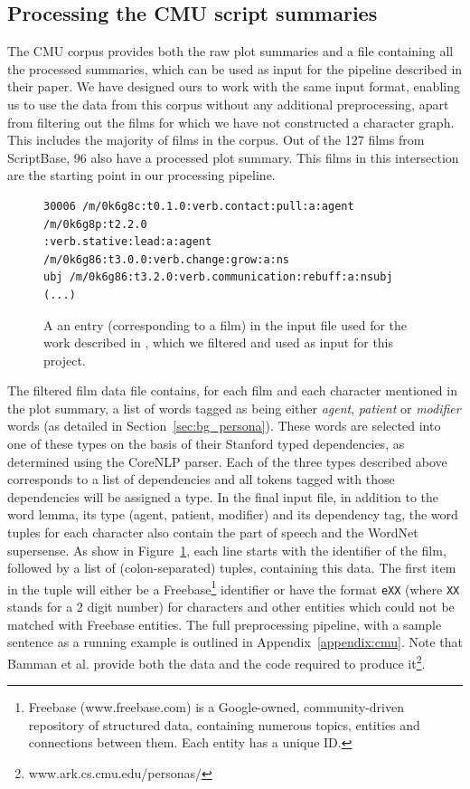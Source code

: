 \documentclass[bsc,frontabs,singlespacing,parskip, twoside]{infthesis}
\begin{document}
\subsection{Processing the CMU script summaries}
\label{sec:processing_cmu}
The CMU corpus provides both the raw plot summaries and a file containing all the processed summaries, which can be used as input for the pipeline described in their paper. We have designed ours to work with the same input format, enabling us to use the data from this corpus without any additional preprocessing, apart from filtering out the films for which we have not constructed a character graph. This includes the majority of films in the corpus. Out of the 127 films from ScriptBase, 96 also have a processed plot summary. This films in this intersection are the starting point in our processing pipeline.

\begin{figure}[h]
\centering
\begin{minipage}{14.5cm}
\begin{Verbatim}[frame=single]
30006 /m/0k6g8c:t0.1.0:verb.contact:pull:a:agent /m/0k6g8p:t2.2.0
:verb.stative:lead:a:agent /m/0k6g86:t3.0.0:verb.change:grow:a:ns
ubj /m/0k6g86:t3.2.0:verb.communication:rebuff:a:nsubj (...)
\end{Verbatim}
\end{minipage}
\caption{A an entry (corresponding to a film) in the input file used for the work described in \cite{Bamman2013}, which we filtered and used as input for this project.}
\label{fig:bamman_input}
\end{figure}


The filtered film data file contains, for each film and each character mentioned in the plot summary, a list of words tagged as being either \textit{agent}, \textit{patient} or \textit{modifier} words (as detailed in Section~\ref{sec:bg_persona}). These words are selected into one of these types on the basis of their Stanford typed dependencies, as determined using the CoreNLP parser. Each of the three types described above corresponds to a list of dependencies and all tokens tagged with those dependencies will be assigned a type. In the final input file, in addition to the word lemma, its type (agent, patient, modifier) and its dependency tag, the word tuples for each character also contain the part of speech and the WordNet supersense. As show in Figure~\ref{fig:bamman_input}, each line starts with the identifier of the film, followed by a list of (colon-separated) tuples, containing this data. The first item in the tuple will either be a Freebase\footnote{Freebase (www.freebase.com) is a Google-owned, community-driven repository of structured data, containing numerous topics, entities and connections between them. Each entity has a unique ID.} identifier or have the format \texttt{eXX} (where \texttt{XX} stands for a 2 digit number) for characters and other entities which could not be matched with Freebase entities. The full preprocessing pipeline, with a sample sentence as a running example is outlined in Appendix~\ref{appendix:cmu}. Note that Bamman et al. provide both the data and the code required to produce it\footnote{www.ark.cs.cmu.edu/personas/}.
\end{document}
